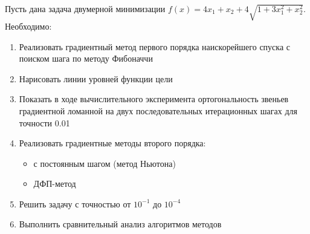 \documentclass[../body.tex]{subfiles}
\begin{document}
Пусть дана задача двумерной минимизации $f(x)=4x_1+x_2+4\sqrt{1+3x_1^2+x_2^2}$. Необходимо:
\begin{enumerate}
    \item Реализовать градиентный метод первого порядка наискорейшего спуска с поиском шага по методу Фибоначчи
    \item Нарисовать линии уровней функции цели
    \item Показать в ходе вычислительного эксперимента ортогональность звеньев градиентной ломанной на двух последовательных итерационных шагах для точности 0.01
    \item Реализовать градиентные методы второго порядка:
        \begin{itemize}
            \item с постоянным шагом (метод Ньютона)
            \item ДФП-метод
        \end{itemize}
    \item Решить задачу с точностью от $10^{-1}$ до $10^{-4}$
    \item Выполнить сравнительный анализ алгоритмов методов
\end{enumerate}
\end{document}
